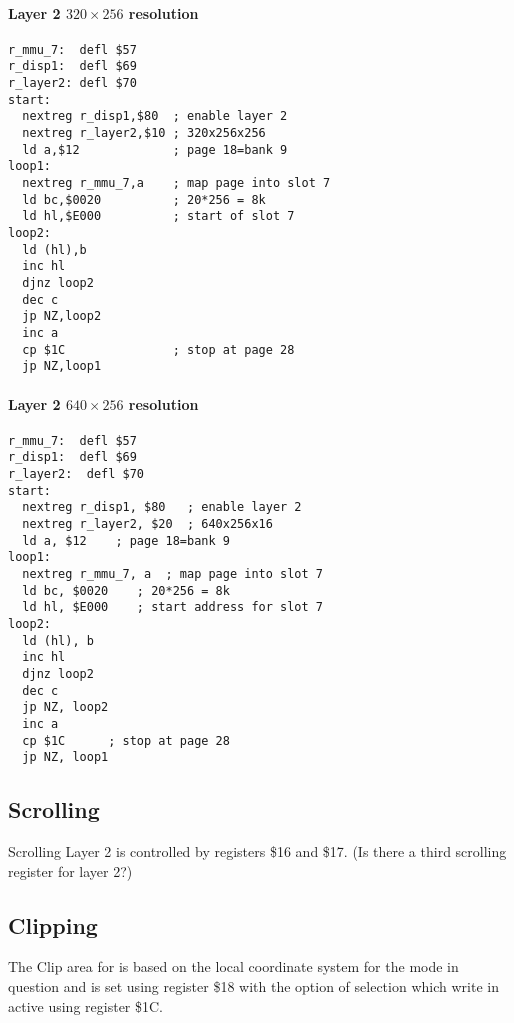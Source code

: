 \paragraph{Layer 2 $320\times256$ resolution}
\begin{verbatim}
r_mmu_7:  defl $57
r_disp1:  defl $69
r_layer2: defl $70
start:
  nextreg r_disp1,$80  ; enable layer 2
  nextreg r_layer2,$10 ; 320x256x256
  ld a,$12             ; page 18=bank 9
loop1:
  nextreg r_mmu_7,a    ; map page into slot 7
  ld bc,$0020          ; 20*256 = 8k
  ld hl,$E000          ; start of slot 7
loop2:
  ld (hl),b
  inc hl
  djnz loop2
  dec c
  jp NZ,loop2
  inc a
  cp $1C               ; stop at page 28
  jp NZ,loop1
\end{verbatim}

\paragraph{Layer 2 $640\times256$ resolution}
\begin{verbatim}
r_mmu_7:  defl $57
r_disp1:  defl $69
r_layer2:  defl $70
start:
  nextreg r_disp1, $80   ; enable layer 2
  nextreg r_layer2, $20  ; 640x256x16
  ld a, $12    ; page 18=bank 9
loop1:
  nextreg r_mmu_7, a  ; map page into slot 7
  ld bc, $0020    ; 20*256 = 8k
  ld hl, $E000    ; start address for slot 7
loop2:
  ld (hl), b
  inc hl
  djnz loop2
  dec c
  jp NZ, loop2
  inc a
  cp $1C      ; stop at page 28
  jp NZ, loop1
\end{verbatim}

\subsection{Scrolling}
Scrolling Layer 2 is controlled by registers \$16 and \$17. (Is there
a third scrolling register for layer 2?)




\subsection{Clipping}
The Clip area for is based on the local coordinate system for the mode
in question and is set using register \$18 with the option of
selection which write in active using register \$1C.



